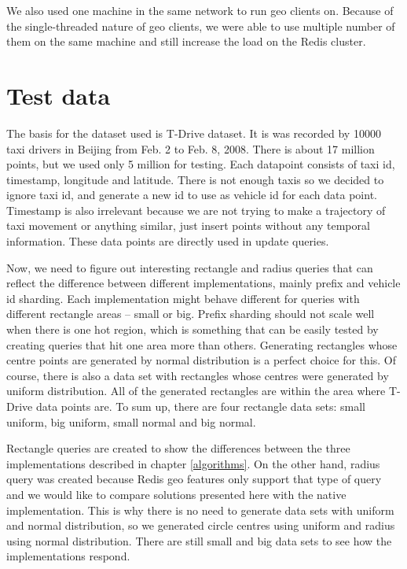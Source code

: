 \documentclass[times, utf8, diplomski]{fer}
\begin{document}
We also used one machine in the same network to run geo clients on. Because of the single-threaded nature of geo clients, we were able to use multiple number of them on the same machine and still increase the load on the Redis cluster.

\section {Test data} \label{test}
The basis for the dataset used is T-Drive \cite{tdrive1, tdrive2} dataset. It is was recorded by 10000 taxi drivers in Beijing from Feb. 2 to Feb. 8, 2008. There is about 17 million points, but we used only 5 million for testing. Each datapoint consists of taxi id, timestamp, longitude and latitude. There is not enough taxis so we decided to ignore taxi id, and generate a new id to use as vehicle id for each data point. Timestamp is also irrelevant because we are not trying to make a trajectory of taxi movement or anything similar, just insert points without any temporal information. These data points are directly used in update queries.

Now, we need to figure out interesting rectangle and radius queries that can reflect the difference between different implementations, mainly prefix and vehicle id sharding. Each implementation might behave different for queries with different rectangle areas -- small or big. Prefix sharding should not scale well when there is one hot region, which is something that can be easily tested by creating queries that hit one area more than others. Generating rectangles whose centre points are generated by normal distribution is a perfect choice for this. Of course, there is also a data set with rectangles whose centres were generated by uniform distribution. All of the generated rectangles are within the area where T-Drive data points are. To sum up, there are four rectangle data sets: small uniform, big uniform, small normal and big normal.

Rectangle queries are created to show the differences between the three implementations described in chapter \ref{algorithms}. On the other hand, radius query was created because Redis geo features only support that type of query and we would like to compare solutions presented here with the native implementation. This is why there is no need to generate data sets with uniform and normal distribution, so we generated circle centres using uniform and radius using normal distribution. There are still small and big data sets to see how the implementations respond.
\end{document}
